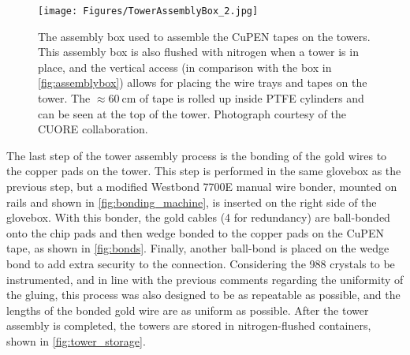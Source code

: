 \begin{figure}[htbp]
    \centering
    \texttt{[image: Figures/TowerAssemblyBox\_2.jpg]}
    \caption[The assembly box used to assemble the CuPEN tapes on the towers]
    {The assembly box used to assemble the CuPEN tapes on the towers.
    This assembly box is also flushed with nitrogen when a tower is in place, and the vertical access (in comparison with the box in \autoref{fig:assemblybox}) allows for placing the wire trays and tapes on the tower.
    The $\approx60~\textrm{cm}$ of tape is rolled up inside PTFE cylinders and can be seen at the top of the tower.
    Photograph courtesy of the CUORE collaboration.}
    \label{fig:assemblybox_2}
\end{figure}

The last step of the tower assembly process is the bonding of the gold wires to the copper pads on the tower.
This step is performed in the same glovebox as the previous step, but a modified Westbond 7700E manual wire bonder, mounted on rails and shown in \autoref{fig:bonding_machine}, is inserted on the right side of the glovebox.
With this bonder, the gold cables (4 for redundancy) are ball-bonded onto the chip pads and then wedge bonded to the copper pads on the CuPEN tape, as shown in \autoref{fig:bonds}.
Finally, another ball-bond is placed on the wedge bond to add extra security to the connection.
Considering the 988 crystals to be instrumented, and in line with the previous comments regarding the uniformity of the gluing, this process was also designed to be as repeatable as possible, and the lengths of the bonded gold wire are as uniform as possible.
After the tower assembly is completed, the towers are stored in nitrogen-flushed containers, shown in \autoref{fig:tower_storage}.

